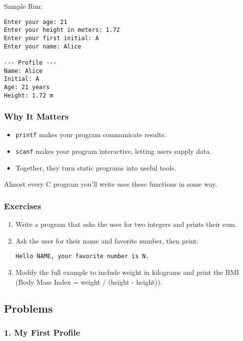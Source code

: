 \documentclass[
  letterpaper,
  DIV=11,
  numbers=noendperiod]{scrreprt}
\providecommand{\tightlist}{%
  \setlength{\itemsep}{0pt}\setlength{\parskip}{0pt}}
\begin{document}
Sample Run:

\begin{verbatim}
Enter your age: 21
Enter your height in meters: 1.72
Enter your first initial: A
Enter your name: Alice

--- Profile ---
Name: Alice
Initial: A
Age: 21 years
Height: 1.72 m
\end{verbatim}

\subsubsection{Why It Matters}\label{why-it-matters-9}

\begin{itemize}
\tightlist
\item
  \texttt{printf} makes your program communicate results.
\item
  \texttt{scanf} makes your program interactive, letting users supply
  data.
\item
  Together, they turn static programs into useful tools.
\end{itemize}

Almost every C program you'll write uses these functions in some way.

\subsubsection{Exercises}\label{exercises-9}

\begin{enumerate}
\def\labelenumi{\arabic{enumi}.}
\item
  Write a program that asks the user for two integers and prints their
  sum.
\item
  Ask the user for their name and favorite number, then print:

\begin{verbatim}
Hello NAME, your favorite number is N.
\end{verbatim}
\item
  Modify the full example to include weight in kilograms and print the
  BMI (Body Mass Index = weight / (height - height)).
\end{enumerate}

\subsection{Problems}\label{problems}

\subsubsection{1. My First Profile}\label{my-first-profile}
\end{document}
